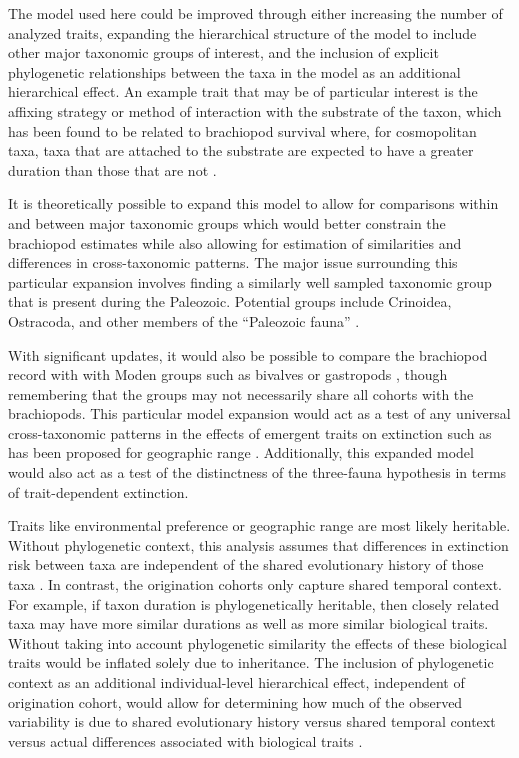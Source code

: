 \documentclass[11pt]{article}
\begin{document}
The model used here could be improved through either increasing the number of analyzed traits, expanding the hierarchical structure of the model to include other major taxonomic groups of interest, and the inclusion of explicit phylogenetic relationships between the taxa in the model as an additional hierarchical effect. An example trait that may be of particular interest is the affixing strategy or method of interaction with the substrate of the taxon, which has been found to be related to brachiopod survival where, for cosmopolitan taxa, taxa that are attached to the substrate are expected to have a greater duration than those that are not \citep{Alexander1977}.

It is theoretically possible to expand this model to allow for comparisons within and between major taxonomic groups which would better constrain the brachiopod estimates while also allowing for estimation of similarities and differences in cross-taxonomic patterns. The major issue surrounding this particular expansion involves finding a similarly well sampled taxonomic group that is present during the Paleozoic. Potential groups include Crinoidea, Ostracoda, and other members of the ``Paleozoic fauna'' \citep{Sepkoski1981a}.

With significant updates, it would also be possible to compare the brachiopod record with with Moden groups such as bivalves or gastropods \citep{Sepkoski1981a}, though remembering that the groups may not necessarily share all cohorts with the brachiopods. This particular model expansion would act as a test of any universal cross-taxonomic patterns in the effects of emergent traits on extinction such as has been proposed for geographic range \citep{Payne2007}. Additionally, this expanded model would also act as a test of the distinctness of the \citet{Sepkoski1981a} three-fauna hypothesis in terms of trait-dependent extinction.

Traits like environmental preference or geographic range \citep{Jablonski1987,Hunt2005b} are most likely heritable. Without phylogenetic context, this analysis assumes that differences in extinction risk between taxa are independent of the shared evolutionary history of those  taxa \citep{Felsenstein1985b}. In contrast, the origination cohorts only capture shared temporal context. For example, if taxon duration is phylogenetically heritable, then closely related taxa may have more similar durations as well as more similar biological traits. Without taking into account phylogenetic similarity the effects of these biological traits would be inflated solely due to inheritance. The inclusion of phylogenetic context as an additional individual-level hierarchical effect, independent of origination cohort, would allow for determining how much of the observed variability is due to shared evolutionary history versus shared temporal context versus actual differences associated with biological traits \citep{Smits2015}.
\end{document}
